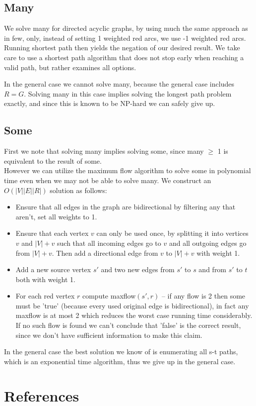 \documentclass{tufte-handout}
\begin{document}
\subsection{Many}
We solve many for directed acyclic graphs,
by using much the same approach as in few,
only, instead of setting 1 weighted red arcs,
we use -1 weighted red arcs.
Running shortest path then yields the negation
of our desired result.
We take care to use a shortest path algorithm
that does not stop early when reaching a valid path,
but rather examines all options.

In the general case we cannot solve many,
because the general case includes $R = G$.
Solving many in this case implies solving 
the longest path problem exactly, 
and since this is known to be NP-hard
we can safely give up. %

\subsection{Some}
First we note that solving many implies solving some,
since many $\ge$ 1 is equivalent to the result of some. \\

However we can utilize the maximum flow algorithm to solve
some in polynomial time even when we may not be able to solve many.
We construct an $O(|V||E||R|)$ solution as follows:
\begin{itemize}
  \item Ensure that all edges in the graph are bidirectional by filtering any that aren't, set all weights to 1.
  \item Ensure that each vertex $v$ can only be used once, by splitting it into vertices $v$ and $|V|+v$ such that all incoming edges go to
  $v$ and all outgoing edges go from $|V|+v$. Then add a directional edge from $v$ to $|V|+v$ with weight 1.
  \item Add a new source vertex $s'$ and two new edges from $s'$ to $s$ and from $s'$ to $t$ both with weight 1.
  \item For each red vertex $r$ compute maxflow$(s', r)$ -- if any flow is 2
    then some must be 'true' (because every used original edge is
    bidirectional), in fact any maxflow is at most 2 which reduces the worst
    case running time considerably.
    If no such flow is found we can't conclude that 'false' is the 
    correct result, since we don't have sufficient information to make this claim.
\end{itemize}

In the general case the best solution we know of is 
enumerating all s-t paths, which is an exponential time algorithm,
thus we give up in the general case.


\section{References}
\begin{description}

\end{description}
\end{document}
